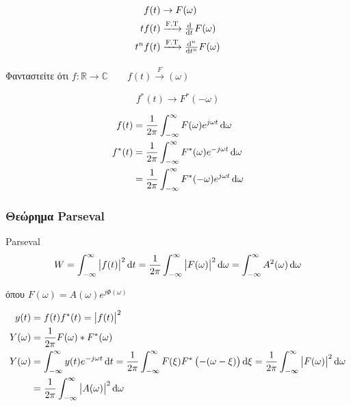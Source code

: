      \begin{align*}
     f(t)&\to F(\omega )\\
     tf(t)&\xrightarrow{\text{F.T}}\od{}{t} F(\omega )\\
     t^nf(t)&\xrightarrow{\text{F.T}}\od[n]{}{t} F(\omega )\\
     \end{align*}
     
     \paragraph{}
     Φανταστείτε ότι \( f:\mathbb R\to\mathbb C \qquad 
     f(t) \xrightarrow F(\omega )
      \)
     
     \[
     f^*(t) \to F^*(-\omega )
     \]
     
     \begin{align*}
     f(t) &= \frac{1}{2\pi}\int_{-\infty}^{\infty} F(\omega)e^{j\omega t}\dif \omega \\
     f^*(t) &= \frac{1}{2\pi}\int_{-\infty}^{\infty} 
     F^*(\omega)e^{-j\omega t}\dif \omega \\
     &= \frac{1}{2\pi}\int_{-\infty}^{\infty}
     F^*(-\omega )e^{j\omega t}\dif \omega 
     \end{align*}
     
     \subsubsection{Θεώρημα Parseval}
     
     
     \begin{theorem*}[title=Θεώρημα Parseval,width=\textwidth]{Parseval}
        \begin{align*}
        W = \int_{-\infty}^{\infty} \left| f(t) \right|^2\dif t
        =\frac{1}{2\pi}\int_{-\infty}^{\infty} \left|F(\omega )\right|^2
        \dif \omega = \int_{-\infty}^{\infty} A^2(\omega )\dif \omega 
        \end{align*}
        
        όπου \( \displaystyle F(\omega ) = A(\omega )e^{j\varPhi(\omega )} \)
     \end{theorem*}
     
     \begin{align*}
     y(t) &= f(t)f^*(t)=\left|f(t)\right|^2 \\
     Y(\omega ) &= \frac{1}{2\pi} F(\omega )*F^*(\omega ) \\
     Y(\omega ) &= \int_{-\infty}^{\infty} y(t)e^{-j\omega t}\dif t
     = \frac{1}{2\pi} \int_{-\infty}^{\infty} F(\xi) F^*\left(
     -(\omega -\xi) \right)\dif \xi
     = \frac{1}{2\pi}\int_{-\infty}^{\infty} \left|F(\omega )\right|^2\dif \omega 
     \\ &= \frac{1}{2\pi}\int_{-\infty}^{\infty} \left|A(\omega )\right|^2\dif\omega
     \end{align*}
     
